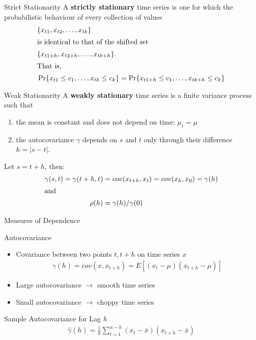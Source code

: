 \documentclass[ignorenonframetext,xcolor=x11names]{beamer}
\begin{document}
\begin{frame}{Strict Stationarity}
A \textbf{strictly stationary} time series is one for which the probabilistic behaviour of every collection of values
\begin{align*}&\{x_{t1}, x_{t2}, \ldots, x_{tk} \} \\
\intertext{is identical to that of the shifted set}
&\{x_{t1+h}, x_{t2+h}, \ldots, x_{tk + h} \}. \\
\intertext{That is,}
&\Pr \{ x_{t1} \leq c_1, \ldots, x_{tk} \leq c_k \} = \Pr \{ x_{t1+h}\leq c_1, \ldots , x_{tk+h} \leq c_k \}
\end{align*}
\end{frame}

\begin{frame}{Weak Stationarity}
A \textbf{weakly stationary} time series is a finite variance process such that
\begin{enumerate}
\item the mean is constant and does not depend on time: $\mu_t = \mu$
\item the autocovariance $\gamma$ depends on $s$ and $t$ only through their difference $h=|s-t|$.
\end{enumerate}
Let $s = t + h$, then:
\begin{align*}
\gamma(s, t) = \gamma(t+h, t) &= cov(x_{t+h}, x_t) = cov(x_h, x_0) = \gamma(h) \\
\intertext{and}
\rho(h) &= \gamma(h) / \gamma(0)
\end{align*}
\end{frame}

\begin{frame}{Measures of Dependence}
\begin{block}{Autocovariance}
\begin{itemize}
   \item Covariance between two points $t, t+h$ on time series $x$ 
\begin{align*}
\gamma(h) = cov(x, x_{t+h}) = E [ (x_t - \mu)(x_{t+h} - \mu)] 
\end{align*}
\vspace{-\baselineskip}
   \item Large autocovariance $\rightarrow$ smooth time series
   \item Small autocovariance $\rightarrow$ choppy time series
\end{itemize}
\end{block}
\begin{block}{Sample Autocovariance for Lag \emph{h}}
\begin{align*}
\hat{\gamma}(h)  = \frac{1}{n} \sum_{t=1}^{n-h} (x_t - \bar{x})(x_{t+h} - \bar{x})
\end{align*}
\end{block}
\end{frame}
\end{document}
